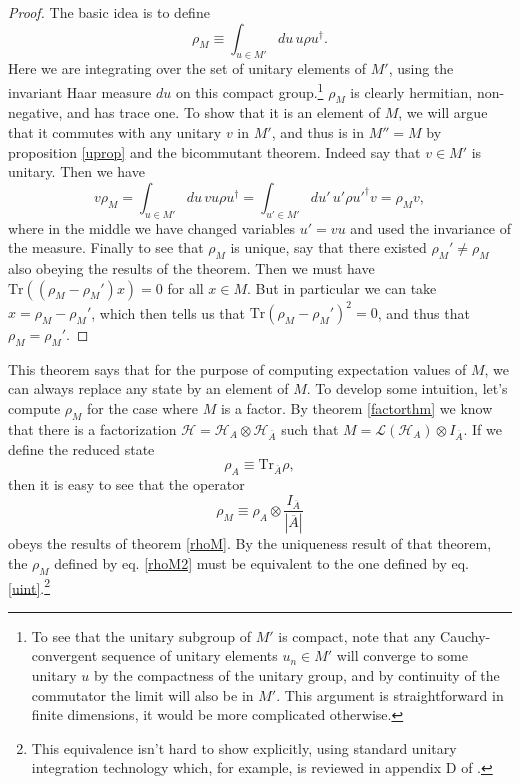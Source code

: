 \documentclass[12pt]{article}
\newcommand{\be}{\begin{equation}}
\newcommand{\ee}{\end{equation}}
\newcommand{\Tr}{\mathrm{Tr}}
\newcommand{\Ll}{\mathcal{L}}
\newcommand{\Hh}{\mathcal{H}}
\newcommand{\HA}{\mathcal{H}_A}
\newcommand{\HAb}{\mathcal{H}_{\ol{A}}}
\newcommand{\Ab}{\ol{A}}
\newcommand{\ol}{\overline}
\begin{document}
\begin{proof}
The basic idea is to define 
\be\label{uint}
\rho_M\equiv \int_{u\in M'} du\, u \rho u^\dagger.
\ee
Here we are integrating over the set of unitary elements of $M'$, using the invariant Haar measure $du$ on this compact group.\footnote{To see that the unitary subgroup of $M'$ is compact, note that any Cauchy-convergent sequence of unitary elements $u_n \in M'$ will converge to some unitary $u$ by the compactness of the unitary group, and by continuity of the commutator the limit will also be in $M'$.  This argument is straightforward in finite dimensions, it would be more complicated otherwise.}  $\rho_M$ is clearly hermitian, non-negative, and has trace one.  To show that it is an element of $M$, we will argue that it commutes with any unitary $v$ in $M'$, and thus is in $M''=M$ by proposition \eqref{uprop} and the bicommutant theorem.  Indeed say that $v\in M'$ is unitary.  Then we have
\be
v\rho_M=\int_{u\in M'} du \,vu\rho u^\dagger=\int_{u'\in M'} du' \,u'\rho u'^\dagger v=\rho_M v,
\ee 
where in the middle we have changed variables $u'=vu$ and used the invariance of the measure.  Finally to see that $\rho_M$ is unique, say that there existed $\rho_M'\neq \rho_M$ also obeying the results of the theorem.  Then we must have $\Tr\left((\rho_M-\rho_M')x\right)=0$ for all $x\in M$.  But in particular we can take $x=\rho_M-\rho_M'$, which then tells us that $\Tr (\rho_M-\rho_M')^2=0$, and thus that $\rho_M=\rho_M'$.  
\end{proof}
This theorem says that for the purpose of computing expectation values of $M$, we can always replace any state by an element of $M$.  To develop some intuition, let's compute $\rho_M$ for the case where $M$ is a factor. By theorem \eqref{factorthm} we know that there is a factorization $\Hh=\HA\otimes \HAb$ such that $M=\Ll(\HA)\otimes I_{\Ab}$.  If we define the reduced state
\be
\rho_A\equiv \Tr_{\Ab}\rho,
\ee
then it is easy to see that the operator
\be\label{rhoM2}
\rho_M\equiv \rho_A\otimes \frac{I_{\Ab}}{|\Ab|}
\ee
obeys the results of theorem \eqref{rhoM}.  By the uniqueness result of that theorem, the $\rho_M$ defined by eq. \eqref{rhoM2} must be equivalent to the one defined by eq. \eqref{uint}.\footnote{This equivalence isn't hard to show explicitly, using standard unitary integration technology which, for example, is reviewed in appendix D of \cite{Harlow:2014yka}.}
\end{document}
